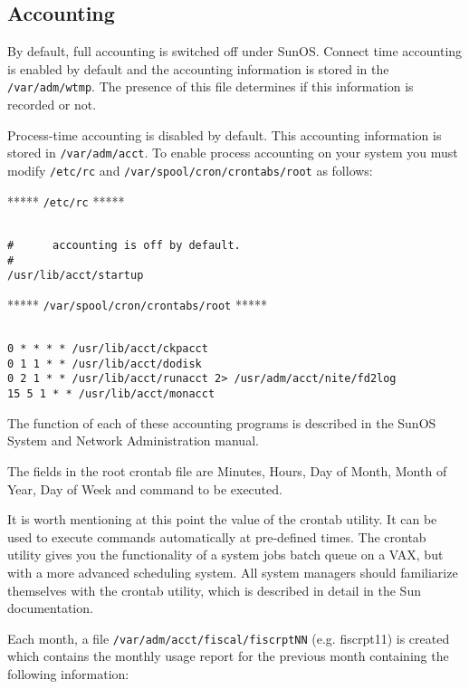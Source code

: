 \subsection{Accounting}

By default, full accounting is switched off under SunOS. Connect time
accounting is enabled by default and the accounting information is stored in the
{\tt /var/adm/wtmp}. The presence of this file determines if this information 
is recorded or not. 

Process-time accounting is disabled by default. This accounting information is
stored in {\tt /var/adm/acct}. To enable process accounting on your system you 
must modify {\tt /etc/rc} and {\tt /var/spool/cron/crontabs/root} as follows:

***** {\tt /etc/rc} *****

\begin{verbatim}

#      accounting is off by default.
#
/usr/lib/acct/startup

\end{verbatim}

***** {\tt /var/spool/cron/crontabs/root} *****

\begin{verbatim}

0 * * * * /usr/lib/acct/ckpacct
0 1 1 * * /usr/lib/acct/dodisk
0 2 1 * * /usr/lib/acct/runacct 2> /usr/adm/acct/nite/fd2log
15 5 1 * * /usr/lib/acct/monacct

\end{verbatim}


The function of each of these accounting programs is described in
the SunOS System and Network Administration manual.

The fields in the root crontab file are Minutes, Hours, Day of Month, 
Month of Year, Day of Week and command to be executed.
                              
It is worth mentioning at this point the value of the crontab utility.
It can be used to execute commands automatically at pre-defined times. The 
crontab utility gives you the functionality of a system jobs batch queue
on a VAX, but with a more advanced scheduling system. All system managers
should familiarize themselves with the crontab utility, which is described 
in detail in the Sun documentation. 

Each month, a file {\tt /var/adm/acct/fiscal/fiscrptNN} (e.g. fiscrpt11)
is created which contains the monthly usage report for the previous month
containing the following information:

